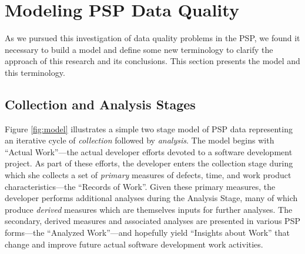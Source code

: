 
\section{Modeling PSP Data Quality}
\label{sec:model}

As we pursued this investigation of data quality problems in the PSP, we
found it necessary to build a model and define some new terminology to 
clarify the approach of this research and its conclusions. This section
presents the model and this terminology.


\subsection{Collection and Analysis Stages}

\begin{figure*}
    {\centerline{}}
    \caption{\label{fig:model} A simple model for PSP data quality. Through 
      a process of {\em collection}, the developer generates an initial
      empirical representation (``Records of Work'') of her personal process
      (``Actual Work'').  Through additional {\em analyses}, the developer
      augments her initial empirical representation with
      derived data (``Analyzed Work'') intended to enable process improvement
      through ``Insights about Work''.
      }
\end{figure*}
     
Figure \ref{fig:model} illustrates a simple two stage model of PSP data
representing an iterative cycle of {\em collection} followed by {\em
  analysis}. The model begins with ``Actual Work''---the actual developer
efforts devoted to a software development project.  As part of these
efforts, the developer enters the collection stage during which she
collects a set of {\em primary} measures of defects, time, and work product
characteristics---the ``Records of Work''.  Given these primary measures,
the developer performs additional analyses during the Analysis Stage, many
of which produce {\em derived} measures which are themselves inputs for
further analyses.  The secondary, derived measures and associated analyses
are presented in various PSP forms---the ``Analyzed Work''---and hopefully
yield ``Insights about Work'' that change and improve future actual
software development work activities.

